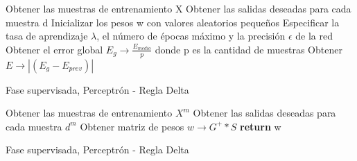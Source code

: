 \documentclass[
	11pt, %
]{beamer}
\begin{document}
\begin{frame}
  \begin{algorithm}[H]
  \scriptsize
    \SetAlgoLined
    Obtener las muestras de entrenamiento X\;
    Obtener las salidas deseadas para cada muestra d\;
    Inicializar los pesos w con valores aleatorios pequeños\;
    Especificar la tasa de aprendizaje $\lambda$, el número de épocas máximo y la precisión $\epsilon$ de la red\;
    Obtener el error global $E_{g} \rightarrow \frac{E_{medio}}{p}$ donde p es la cantidad de muestras\;
    Obtener $E \rightarrow |(E_{g}-E_{prev})|$\;
    \caption{Fase supervisada, Perceptrón - Regla Delta}
  \end{algorithm}
\end{frame}

\begin{frame}
  \begin{algorithm}[H]
  \scriptsize
    \SetAlgoLined
    Obtener las muestras de entrenamiento $X^{m}$\;
    Obtener las salidas deseadas para cada muestra $d^{m}$\;
    Obtener matriz de pesos $w \rightarrow G^{+} * S$\;
    \textbf{return} w\;
    \caption{Fase supervisada, Perceptrón - Regla Delta}
  \end{algorithm}
\end{frame}
\end{document}

